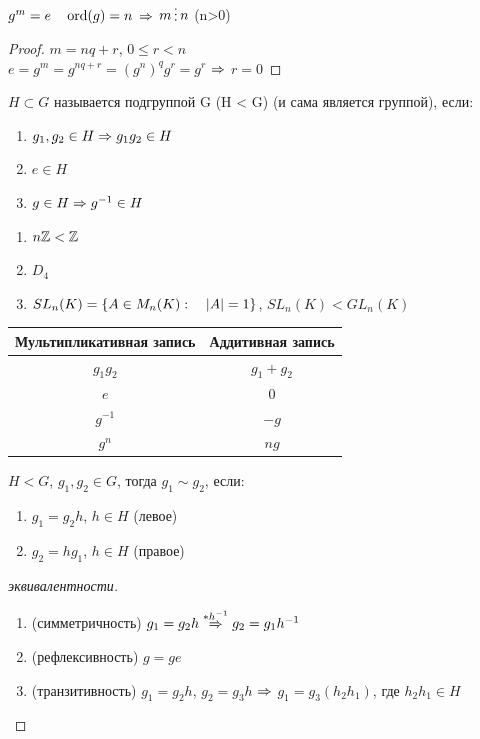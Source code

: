 \documentclass[12pt, fleqn]{article}
\begin{document}
\begin{utv}
    $g^m=e \quad \mathop{\rm ord}\nolimits(g)=n$ $\Rightarrow$ $m \devides n$ (n>0)
\end{utv}
\begin{proof}
    $m=n q+r$, $0 \leqslant r < n$
    \\
    $e=g^m=g^{n q + r}=(g^n)^q g^r=g^r$ $\Rightarrow$ $r=0$
\end{proof}

\begin{definition}
    $H \subset G$ называется подгруппой G (H < G) (и сама является группой), если:
    \begin{enumerate}
    	\item $g_1,g_2 \in H \Rightarrow g_1 g_2 \in H$
    	\item $e \in H$
    	\item $g \in H \Rightarrow g^{-1} \in H$
	\end{enumerate}
\end{definition}

\begin{example}
    \begin{enumerate}
    	\item $n\mathbb{Z} < \mathbb{Z}$
    	\item $D_4$
    	\item $SL_n(K)=\{A \in M_n(K): \quad |A|=1\}$, $SL_n(K)<GL_n(K)$
	\end{enumerate}
\end{example}

\begin{tabular} {c|c}
	Мультипликативная запись & Аддитивная запись\\ \hline
	$g_1 g_2$ & $g_1 + g_2$\\
	$e$ & $0$\\
	$g^{-1}$ & $-g$\\
    $g^n$ & $n g$
\end{tabular}

\begin{definition}
    $H<G$, $g_1,g_2 \in G$, тогда $g_1 \sim g_2$, если:
    \begin{enumerate}
    	\item $g_1=g_2 h$, $h \in H$ (левое)
    	\item $g_2=h g_1$, $h \in H$ (правое)
	\end{enumerate}
\end{definition}

\begin{proof}[эквивалентности]
    \begin{enumerate}
    	\item (симметричность) $g_1=g_2 h \overset{*h^{-1}}{\Rightarrow} g_2 = g_1 h^{-1}$
    	\item (рефлексивность) $g=g e$
    	\item (транзитивность) $g_1=g_2 h$, $g_2 = g_3 h$ $\Rightarrow$ $g_1=g_3(h_2 h_1)$, где $h_2 h_1 \in H$
	\end{enumerate}
\end{proof}
\end{document}
